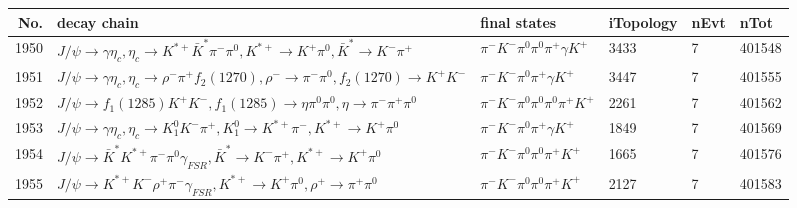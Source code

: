 \begin{table}[htbp] 
\begin{center}
\begin{small}
\begin{tabular}{rlllll}\hline\hline
 No. & decay chain & final states &  iTopology & nEvt & nTot \\\hline
1950&$J/\psi       \rightarrow \gamma       \eta_{c}    , \eta_{c}     \rightarrow K^{*+}         \bar{K}^{*}   \pi^{-}        \pi^{0}        , K^{*+}          \rightarrow K^{+}          \pi^{0}        , \bar{K}^{*}    \rightarrow K^{-}          \pi^{+}        $&$\pi^{-}        K^{-}          \pi^{0}        \pi^{0}        \pi^{+}        \gamma       K^{+}          $& 3433&    7&401548\\
1951&$J/\psi       \rightarrow \gamma       \eta_{c}    , \eta_{c}     \rightarrow \rho^{-}      \pi^{+}        f_{2}(1270)    , \rho^{-}       \rightarrow \pi^{-}        \pi^{0}        , f_{2}(1270)     \rightarrow K^{+}          K^{-}          $&$\pi^{-}        K^{-}          \pi^{0}        \pi^{+}        \gamma       K^{+}          $& 3447&    7&401555\\
1952&$J/\psi       \rightarrow f_{1}(1285)    K^{+}          K^{-}          , f_{1}(1285)     \rightarrow \eta          \pi^{0}        \pi^{0}        , \eta           \rightarrow \pi^{-}        \pi^{+}        \pi^{0}        $&$\pi^{-}        K^{-}          \pi^{0}        \pi^{0}        \pi^{0}        \pi^{+}        K^{+}          $& 2261&    7&401562\\
1953&$J/\psi       \rightarrow \gamma       \eta_{c}    , \eta_{c}     \rightarrow K_1^{0}        K^{-}          \pi^{+}        , K_1^{0}         \rightarrow K^{*+}         \pi^{-}        , K^{*+}          \rightarrow K^{+}          \pi^{0}        $&$\pi^{-}        K^{-}          \pi^{0}        \pi^{+}        \gamma       K^{+}          $& 1849&    7&401569\\
1954&$J/\psi       \rightarrow \bar{K}^{*}   K^{*+}         \pi^{-}        \pi^{0}        \gamma_{FSR} , \bar{K}^{*}    \rightarrow K^{-}          \pi^{+}        , K^{*+}          \rightarrow K^{+}          \pi^{0}        $&$\pi^{-}        K^{-}          \pi^{0}        \pi^{0}        \pi^{+}        K^{+}          $& 1665&    7&401576\\
1955&$J/\psi       \rightarrow K^{*+}         K^{-}          \rho^{+}      \pi^{-}        \gamma_{FSR} , K^{*+}          \rightarrow K^{+}          \pi^{0}        , \rho^{+}       \rightarrow \pi^{+}        \pi^{0}        $&$\pi^{-}        K^{-}          \pi^{0}        \pi^{0}        \pi^{+}        K^{+}          $& 2127&    7&401583\\

\end{tabular}
\end{small}
\end{center}
\end{table}
